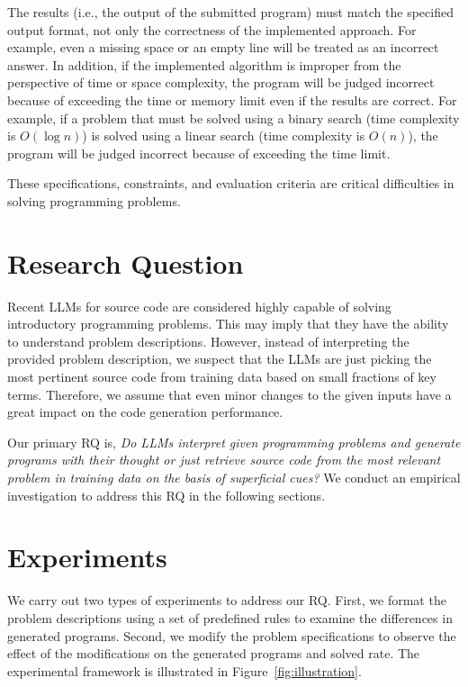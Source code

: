 \documentclass{article}
\begin{document}
The results (i.e., the output of the submitted program) must match the specified output format, not only the correctness of the implemented approach.
For example, even a missing space or an empty line will be treated as an incorrect answer.
In addition, if the implemented algorithm is improper from the perspective of time or space complexity, the program will be judged incorrect because of exceeding the time or memory limit even if the results are correct.
For example, if a problem that must be solved using a binary search (time complexity is $O(\log n)$) is solved using a linear search (time complexity is $O(n)$), the program will be judged incorrect because of exceeding the time limit.

These specifications, constraints, and evaluation criteria are critical difficulties in solving programming problems.







\section{Research Question}
\label{sec:research-question}

Recent LLMs for source code are considered highly capable of solving introductory programming problems.
This may imply that they have the ability to understand problem descriptions. 
However, instead of interpreting the provided problem description, we suspect that the LLMs are just picking the most pertinent source code from training data based on small fractions of key terms.
Therefore, we assume that even minor changes to the given inputs have a great impact on the code generation performance.

Our primary RQ is, \emph{Do LLMs interpret given programming problems and generate programs with their thought or just retrieve source code from the most relevant problem in training data on the basis of superficial cues?}
We conduct an empirical investigation to address this RQ in the following sections.









\section{Experiments}
\label{sec:experiments}

We carry out two types of experiments to address our RQ.
First, we format the problem descriptions using a set of predefined rules to examine the differences in generated programs.
Second, we modify the problem specifications to observe the effect of the modifications on the generated programs and solved rate.
The experimental framework is illustrated in Figure~\ref{fig:illustration}.
\end{document}
